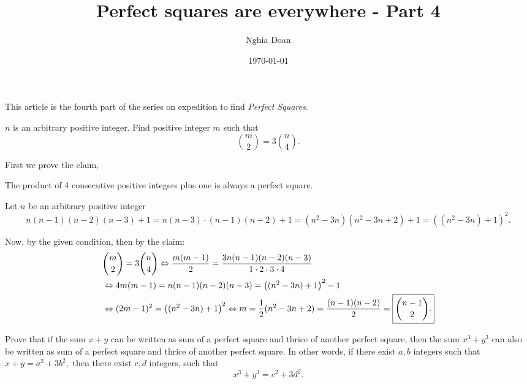 \documentclass{article}
\title{Perfect squares are everywhere - Part 4}
\author{Nghia Doan}
\date{\today}
\begin{document}
\maketitle

This article is the fourth part of the series on expedition to find \textit{Perfect Squares}.

\begin{example*}[Example 16]
    $n$ is an arbitrary positive integer. Find positive integer $m$ such that
    \[
        \binom{m}{2} = 3\binom{n}{4}.
    \]
\end{example*}

\begin{soln}
    First we prove the claim,
    \begin{claim*}
        The product of 4 consecutive positive integers plus one is always a perfect square.
    \end{claim*}
    \begin{subproof}
        Let $n$ be an arbitrary positive integer
        \[
            n(n-1)(n-2)(n-3) +1 = n(n-3)\cdot (n-1)(n-2) +1 = (n^2-3n) (n^2-3n+2) +1 = \left( (n^2-3n) + 1\right)^2.
        \]
    \end{subproof}

    Now, by the given condition, then by the claim:
    \[
        \begin{aligned}
            &\binom{m}{2} = 3\binom{n}{4} \Leftrightarrow \frac{m(m-1)}{2} = \frac{3n(n-1)(n-2)(n-3)}{1\cdot2\cdot3\cdot4}\\
            &\Leftrightarrow 4m(m-1) = n(n-1)(n-2)(n-3) = \left( (n^2-3n) + 1\right)^2 - 1\\
            &\Leftrightarrow (2m-1)^2 = \left( (n^2-3n) + 1\right)^2 \Leftrightarrow m = \frac{1}{2}(n^2-3n + 2) = \frac{(n-1)(n-2)}{2} = \boxed{\binom{n-1}{2}.}
        \end{aligned}
    \]
\end{soln}

\newpage

\begin{example*}[Example 17]
    Prove that if the sum $x + y$ can be written as sum of a perfect square and thrice of another perfect square,
    then the sum $x^3 + y^3$ can also be written as sum of a perfect square and thrice of another perfect square.
    In other words, if there exist $a,b$ integers such that $x+y=a^2+3b^2,$ then there exist $c,d$ integers, such that
    \[
        x^3+y^3 = c^2+3d^2.
    \]
\end{example*}
\end{document}
